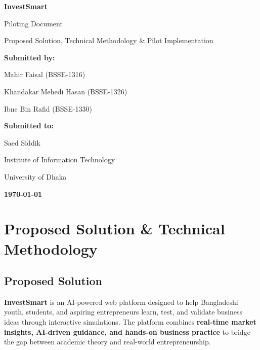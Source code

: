 \documentclass[12pt,letterpaper]{article}
\begin{document}
\begin{titlepage}
    \centering
    \vspace*{2cm}
    
    {\Huge\bfseries\color{primaryblue} InvestSmart}
    
    \vspace{0.3cm}
    {\LARGE\color{secondaryblue} Piloting Document}
    
    \vspace{1cm}
    {\Large\color{accentgray} Proposed Solution, Technical Methodology \& Pilot Implementation}
    
    \vspace{2cm}
    {\large\bfseries Submitted by:}
    
    \vspace{0.5cm}
    {\large Mahir Faisal (BSSE-1316)}
    
    \vspace{0.3cm}
    {\large Khandakar Mehedi Hasan (BSSE-1326)}
    
    \vspace{0.3cm}
    {\large Ibne Bin Rafid (BSSE-1330)}
    
    \vspace{.5cm}
    {\large\bfseries Submitted to:}
    
    \vspace{0.2cm}
    {\large Saed Siddik}
    
    \vspace{0.2cm}
    {\large Institute of Information Technology}
    
    \vspace{0.2cm}
    {\large University of Dhaka}
    
    \vspace{.5cm}
    {\large\bfseries\today}
    
\end{titlepage}

\tableofcontents
\newpage

\section{Proposed Solution \& Technical Methodology}

\subsection{Proposed Solution}

\textbf{InvestSmart} is an AI-powered web platform designed to help Bangladeshi youth, students, and aspiring entrepreneurs learn, test, and validate business ideas through interactive simulations. The platform combines \textbf{real-time market insights, AI-driven guidance, and hands-on business practice} to bridge the gap between academic theory and real-world entrepreneurship.
\end{document}
